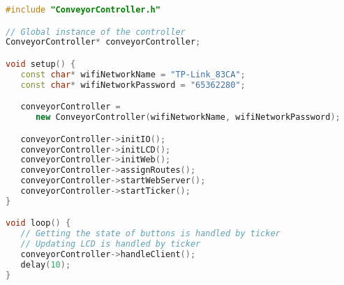\begin{lstlisting}[language=C++, caption={Soubor main.cpp}, label={lst:maincppSoubor}]
#include "ConveyorController.h"

// Global instance of the controller
ConveyorController* conveyorController;

void setup() {
   const char* wifiNetworkName = "TP-Link_83CA";
   const char* wifiNetworkPassword = "65362280";

   conveyorController =
      new ConveyorController(wifiNetworkName, wifiNetworkPassword);

   conveyorController->initIO();
   conveyorController->initLCD();
   conveyorController->initWeb();
   conveyorController->assignRoutes();
   conveyorController->startWebServer();
   conveyorController->startTicker();
}

void loop() {
   // Getting the state of buttons is handled by ticker
   // Updating LCD is handled by ticker
   conveyorController->handleClient();
   delay(10);
}
\end{lstlisting}